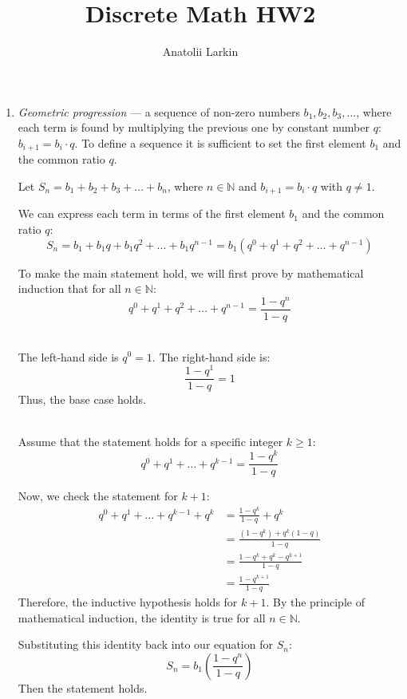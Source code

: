 \documentclass[12pt]{article}
\title{Discrete Math HW2}
\author{Anatolii Larkin}
\begin{document}
\maketitle


\begin{enumerate}

    \item \textit{Geometric progression} --- a sequence of non-zero numbers $b_1, b_2, b_3, \dots$, where each term is found by multiplying the previous one by constant number $q$: $b_{i+1} = b_i \cdot q$. To define a sequence it is sufficient to set the first element $b_1$ and the common ratio $q$.
    
    Let $S_n = b_1 + b_2 + b_3 + \dots + b_n$, where $n \in \mathbb{N}$ and $b_{i+1} = b_i \cdot q$ with $q \neq 1$.
    
    \medskip
    We can express each term in terms of the first element $b_1$ and the common ratio $q$:
    \[
    S_n = b_1 + b_1q + b_1q^2 + \dots + b_1q^{n-1} = b_1(q^0 + q^1 + q^2 + \dots + q^{n-1})
    \]
    
    To make the main statement hold, we will first prove by mathematical induction that for all $n \in \mathbb{N}$:
    \[
    q^0 + q^1 + q^2 + \dots + q^{n-1} = \frac{1 - q^n}{1 - q}
    \]
    
     \\
    The left-hand side is $q^0 = 1$. The right-hand side is:
    \[
    \frac{1 - q^1}{1 - q} = 1
    \]
    Thus, the base case holds.
    
    \medskip
     \\
    Assume that the statement holds for a specific integer $k \ge 1$:
    \[
    q^0 + q^1 + \dots + q^{k-1} = \frac{1 - q^k}{1 - q}
    \]
    
    Now, we check the statement for $k + 1$:
    \begin{align*}
    q^0 + q^1 + \dots + q^{k-1} + q^k &= \frac{1 - q^k}{1 - q} + q^k \\[1ex]
    &= \frac{(1 - q^k) + q^k(1 - q)}{1 - q} \\[1ex]
    &= \frac{1 - q^k + q^k - q^{k+1}}{1 - q} \\[1ex]
    &= \frac{1 - q^{k+1}}{1 - q}
    \end{align*}
    Therefore, the inductive hypothesis holds for $k + 1$. By the principle of mathematical induction, the identity is true for all $n \in \mathbb{N}$.
    
    \medskip
    Substituting this identity back into our equation for $S_n$:
    \[
    S_n = b_1 \left( \frac{1 - q^n}{1 - q} \right)
    \]
    Then the statement holds. 




\end{enumerate}
\end{document}
